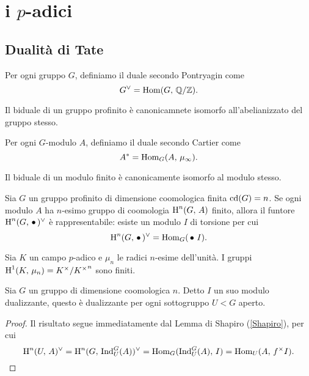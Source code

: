 \chapter{i $ p $-adici}


\section{Dualità di Tate}

\begin{definition}
	Per ogni gruppo $ G $, definiamo il duale secondo Pontryagin come
	\[ G^\vee = \operatorname{Hom}(G, \, \mathbb{Q}/\mathbb{Z}). \]
\end{definition}

\begin{proposition}
	Il biduale di un gruppo profinito è canonicamnete isomorfo all'abelianizzato del gruppo stesso. 
\end{proposition}

\begin{definition}
	Per ogni $ G $-modulo $ A $, definiamo il duale secondo Cartier come
	\[ A^* = \operatorname{Hom}_G(A, \, \mu_\infty). \]
\end{definition}

\begin{proposition}
	Il biduale di un modulo finito è canonicamente isomorfo al modulo stesso.
\end{proposition}

\begin{proposition}
	Sia $ G $ un gruppo profinito di dimensione coomologica finita $ \operatorname{cd}(G) = n $. Se ogni modulo $ A $ ha $ n $-esimo gruppo di coomologia $ \operatorname{H}^n(G, \, A) $ finito, allora il funtore $ \operatorname{H}^n(G,\, \bullet\,)^\vee $ è rappresentabile: esiste un modulo $ I $ di torsione per cui
	\[ \operatorname{H}^n(G, \, \bullet \, )^\vee = \operatorname{Hom}_G(\,\bullet\, \, I). \]
\end{proposition}

\begin{lemma}
	Sia $ K $ un campo $ p $-adico e $ \mu_n $ le radici $ n $-esime dell'unità. I gruppi $ \operatorname{H}^1(K, \, \mu_n) = K^\times / {K^\times}^n $ sono finiti.
\end{lemma}

\begin{lemma}
	Sia $ G $ un gruppo di dimensione coomologica $ n $. Detto $ I $ un suo modulo dualizzante, questo è dualizzante per ogni sottogruppo $ U < G $ aperto.
\end{lemma}
\begin{proof}
	Il risultato segue immediatamente dal Lemma di Shapiro (\ref{Shapiro}), per cui
	\[ \operatorname{H}^n(U, \, A)^\vee = \operatorname{H}^n(G, \, \operatorname{Ind}_U^G(A))^\vee = \operatorname{Hom}_G(\operatorname{Ind}_U^G(A), \, I) = \operatorname{Hom}_U(A, \, f^\times I). \]
\end{proof}


